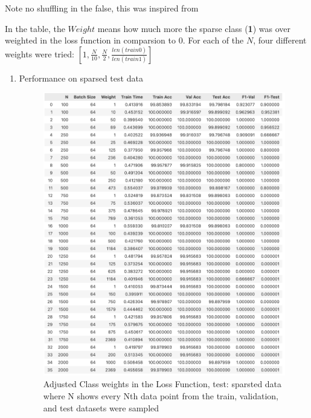 \begin{solve}
Note no shuffling in the false, this was inspired from \cite{No Shuffle}

In the table, the $Weight$ means how much more the sparse class (\textbf{1}) was over weighted in the loss function in comparsion to $0$. For each of the $N$, four different weights were tried:
$\left[1, \frac{N}{10}, \frac{N}{2}, \frac{len(train 0)}{len(train 1)}\right]$

\begin{enumerate}
    \item {Performance on sparsed test data}
    
    \begin{figure}[H]
        \includegraphics[scale=.7]{plots/resampling_on_sparsted_test.png}
        \caption{Adjusted Class weights in the  Loss Function, test: sparsted data where N shows every Nth data point from the train, validation, and test datasets were sampled}
        \label{resampling_sparsed_test}
    \end{figure}


\end{enumerate}
\end{solve}
